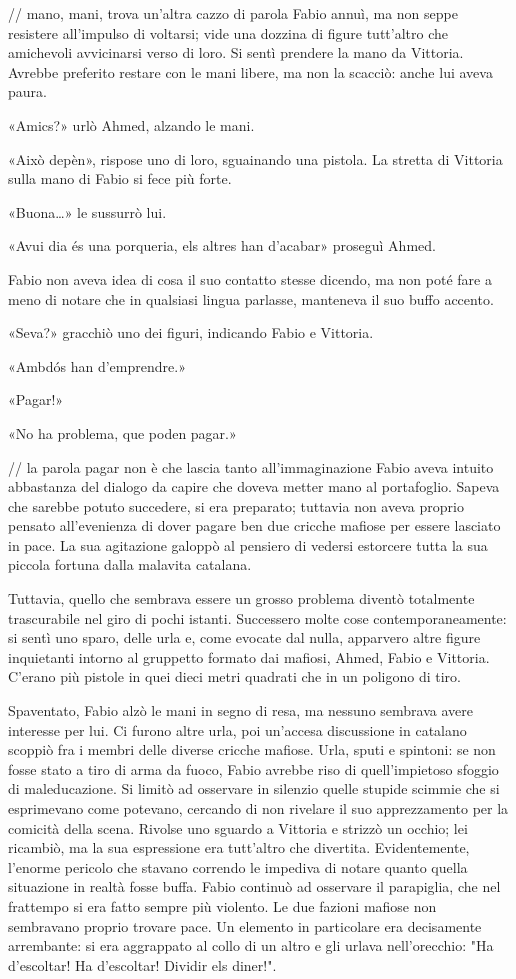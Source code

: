 // mano, mani, trova un'altra cazzo di parola
Fabio annuì, ma non seppe resistere all'impulso di voltarsi; vide una dozzina di figure tutt'altro che amichevoli avvicinarsi verso di loro. Si sentì prendere la mano da Vittoria. Avrebbe preferito restare con le mani libere, ma non la scacciò: anche lui aveva paura.

«Amics?» urlò Ahmed, alzando le mani.

«Això depèn», rispose uno di loro, sguainando una pistola. La stretta di Vittoria sulla mano di Fabio si fece più forte.

«Buona\ldots» le sussurrò lui.

«Avui dia és una porqueria, els altres han d'acabar» proseguì Ahmed.

Fabio non aveva idea di cosa il suo contatto stesse dicendo, ma non poté fare a meno di notare che in qualsiasi lingua parlasse, manteneva il suo buffo accento.

«Seva?» gracchiò uno dei figuri, indicando Fabio e Vittoria.

«Ambdós han d'emprendre.»

«Pagar!»

«No ha problema, que poden pagar.»

// la parola pagar non è che lascia tanto all'immaginazione
Fabio aveva intuito abbastanza del dialogo da capire che doveva metter mano al portafoglio. Sapeva che sarebbe potuto succedere, si era preparato; tuttavia non aveva proprio pensato all'evenienza di dover pagare ben due cricche mafiose per essere lasciato in pace. La sua agitazione galoppò al pensiero di vedersi estorcere tutta la sua piccola fortuna dalla malavita catalana.

Tuttavia, quello che sembrava essere un grosso problema diventò totalmente trascurabile nel giro di pochi istanti. Successero molte cose contemporaneamente: si sentì uno sparo, delle urla e, come evocate dal nulla, apparvero altre figure inquietanti intorno al gruppetto formato dai mafiosi, Ahmed, Fabio e Vittoria. C'erano più pistole in quei dieci metri quadrati che in un poligono di tiro.

Spaventato, Fabio alzò le mani in segno di resa, ma nessuno sembrava avere interesse per lui. Ci furono altre urla, poi un'accesa discussione in catalano scoppiò fra i membri delle diverse cricche mafiose. Urla, sputi e spintoni: se non fosse stato a tiro di arma da fuoco, Fabio avrebbe riso di quell'impietoso sfoggio di maleducazione. Si limitò ad osservare in silenzio quelle stupide scimmie che si esprimevano come potevano, cercando di non rivelare il suo apprezzamento per la comicità della scena. Rivolse uno sguardo a Vittoria e strizzò un occhio; lei ricambiò, ma la sua espressione era tutt'altro che divertita. Evidentemente, l'enorme pericolo che stavano correndo le impediva di notare quanto quella situazione in realtà fosse buffa. Fabio continuò ad osservare il parapiglia, che nel frattempo si era fatto sempre più violento. Le due fazioni mafiose non sembravano proprio trovare pace. Un elemento in particolare era decisamente arrembante: si era aggrappato al collo di un altro e gli urlava nell'orecchio: "Ha d'escoltar! Ha d'escoltar! Dividir els diner!".

